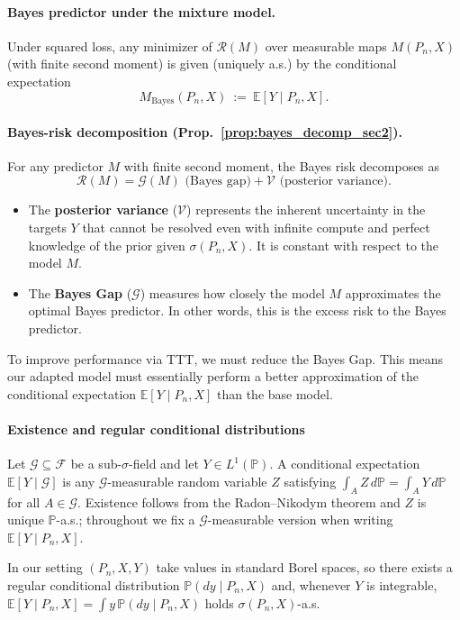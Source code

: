 \documentclass{article}
\theoremstyle{plain}
\theoremstyle{definition}
\theoremstyle{remark}
\begin{document}
\paragraph{Bayes predictor under the mixture model.}
Under squared loss, any minimizer of $\mathcal R(M)$ over measurable maps $M(P_n,X)$ (with finite second moment) is given (uniquely a.s.) by the conditional expectation
\[
    M_{\mathrm{Bayes}}(P_n,X)\ :=\ \mathbb E[Y\mid P_n,X].
\]


\paragraph{Bayes-risk decomposition (Prop.~\ref{prop:bayes_decomp_sec2}).}
For any predictor $M$ with finite second moment, the Bayes risk decomposes as
\[
    \mathcal R(M)
    = \mathcal G(M) \text{ (Bayes gap)}
    + \mathcal V \text{ (posterior variance)}.
\]
\begin{itemize}
\item The \textbf{posterior variance} ($\mathcal{V}$) represents the inherent uncertainty in the targets $Y$ that cannot be resolved even with infinite compute and perfect knowledge of the prior given $\sigma(P_n,X)$. It is constant with respect to the model $M$.
\item  The \textbf{Bayes Gap} ($\mathcal{G}$) measures how closely the model $M$ approximates the optimal Bayes predictor. In other words, this is the excess risk to the Bayes predictor. 
\end{itemize}
To improve performance via TTT, we must reduce the Bayes Gap. This means our adapted model must essentially perform a better approximation of the conditional expectation $\mathbb{E}[Y \mid P_n, X]$ than the base model.


\paragraph{Existence and regular conditional distributions}
\label{rem:condexp_rcd_projection}
Let $\mathcal G\subseteq\mathcal F$ be a sub-$\sigma$-field and let $Y\in L^1(\mathbb P)$.
A conditional expectation $\mathbb E[Y\mid \mathcal G]$ is any $\mathcal G$-measurable random variable $Z$
satisfying $\int_A Z\,d\mathbb P=\int_A Y\,d\mathbb P$ for all $A\in\mathcal G$.
Existence follows from the Radon--Nikodym theorem and $Z$ is unique $\mathbb P$-a.s.; throughout we fix a
$\mathcal G$-measurable version when writing $\mathbb E[Y\mid P_n,X]$.

In our setting $(P_n,X,Y)$ take values in standard Borel spaces, so there exists a regular conditional distribution $\mathbb P(dy\mid P_n,X)$ and, whenever $Y$ is integrable, $\mathbb E[Y\mid P_n,X]=\int y\,\mathbb P(dy\mid P_n,X)$ holds $\sigma(P_n,X)$-a.s.
\end{document}
